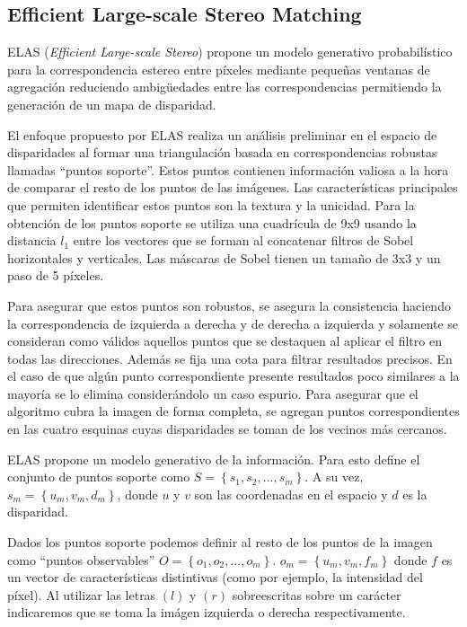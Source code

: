 \documentclass[11pt,a4paper,titlepage]{article}
\begin{document}
\subsection{Efficient Large-scale Stereo Matching}

ELAS (\textit{Efficient Large-scale Stereo}) propone un modelo generativo probabilístico para la correspondencia estereo entre píxeles mediante pequeñas ventanas de agregación reduciendo ambigüedades entre las correspondencias permitiendo la generación de un mapa de disparidad.

El enfoque propuesto por ELAS realiza un análisis preliminar en el espacio de disparidades al formar una triangulación basada en correspondencias robustas llamadas “puntos soporte”. Estos puntos contienen información valiosa a la hora de comparar el resto de los puntos de las imágenes. Las características principales que permiten identificar estos puntos son la textura y la unicidad. Para la obtención de los puntos soporte se utiliza una cuadrícula de 9x9 usando la distancia $l_1$ entre los vectores que se forman al concatenar filtros de Sobel horizontales y verticales. Las máscaras de Sobel tienen un tamaño de 3x3 y un paso de 5 píxeles.

Para asegurar que estos puntos son robustos, se asegura la consistencia haciendo la correspondencia de izquierda a derecha y de derecha a izquierda y solamente se consideran como válidos aquellos puntos que se destaquen al aplicar el filtro en todas las direcciones. Además se fija una cota para filtrar resultados precisos. En el caso de que algún punto correspondiente presente resultados poco similares a la mayoría se lo elimina considerándolo un caso espurio. Para asegurar que el algoritmo cubra la imagen de forma completa, se agregan puntos correspondientes en las cuatro esquinas cuyas disparidades se toman de los vecinos más cercanos.

ELAS propone un modelo generativo de la información. Para esto define el conjunto de puntos soporte como $S = \left\{ s_1, s_2, ... , s_m \right\}$. A su vez, $s_m = \left\{ u_m, v_m, d_m \right\}$, donde $u$ y $v$ son las coordenadas en el espacio y $d$ es la disparidad.

Dados los puntos soporte podemos definir al resto de los puntos de la imagen como “puntos observables” $O = \left\{ o_1, o_2, ... , o_m \right\}$. $o_m = \left\{ u_m, v_m, f_m \right\}$ donde $f$ es un vector de características distintivas (como por ejemplo, la intensidad del píxel). Al utilizar las letras $(l)$ y $(r)$ sobreescritas sobre un carácter indicaremos que se toma la imágen izquierda o derecha respectivamente.
\end{document}
